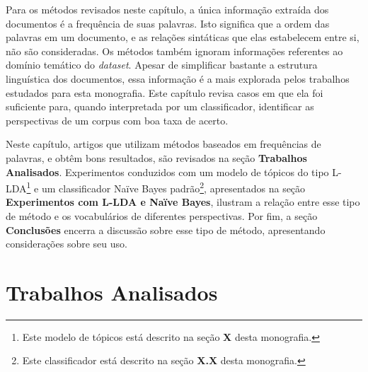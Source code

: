 



Para os métodos revisados neste capítulo, a única informação extraída dos documentos é a frequência de suas palavras. Isto significa que a ordem das palavras em um documento, e as relações sintáticas que elas estabelecem entre si, não são consideradas. Os métodos também ignoram informações referentes ao domínio temático do \emph{dataset}. Apesar de simplificar bastante a estrutura linguística dos documentos, essa informação é a mais explorada pelos trabalhos estudados para esta monografia. Este capítulo revisa casos em que ela foi suficiente para, quando interpretada por um classificador, identificar as perspectivas de um corpus com boa taxa de acerto. 

Neste capítulo, artigos que utilizam métodos baseados em frequências de palavras, e obtêm bons resultados, são revisados na seção \textbf{Trabalhos Analisados}. Experimentos conduzidos com um modelo de tópicos do tipo L-LDA\footnote{Este modelo de tópicos está descrito na seção \textbf{X} desta monografia.} e um classificador Naïve Bayes padrão\footnote{Este classificador está descrito na seção \textbf{X.X} desta monografia.}, apresentados na seção \textbf{Experimentos com L-LDA e Naïve Bayes}, ilustram a relação entre esse tipo de método e os vocabulários de diferentes perspectivas. Por fim, a seção \textbf{Conclusões} encerra a discussão sobre esse tipo de método, apresentando considerações sobre seu uso.

\section{Trabalhos Analisados}





